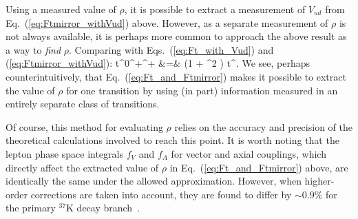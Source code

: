 Using a measured value of $\rho$, it is possible to extract a measurement of $V_{ud}$ from Eq.~(\ref{eq:Ftmirror_withVud}) above.  However, as a separate measurement of $\rho$ is not always available, it is perhaps more common to approach the above result as a way to \emph{find} $\rho$.  Comparing with Eqs.~(\ref{eq:Ft_with_Vud}) and (\ref{eq:Ftmirror_withVud}):  
\bea
{}t^{0^+\!^+}
&=& 
 \left(1 + \rho^2 \right) t^{}.
\label{eq:Ft_and_Ftmirror}
\eea
We see, perhaps counterintuitively, that Eq.~(\ref{eq:Ft_and_Ftmirror}) makes it possible to extract the value of $\rho$ for one transition by using (in part) information measured in an entirely separate class of transitions.  

Of course, this method for evaluating $\rho$ relies on the accuracy and precision of the theoretical calculations involved to reach this point.  It is worth noting that the lepton phase space integrals $f_V$ and $f_A$ for vector and axial couplings, which directly affect the extracted value of $\rho$ in Eq.~(\ref{eq:Ft_and_Ftmirror}) above, are identically the same under the allowed approximation.  However, when higher-order corrections are taken into account, they are found to differ by $\sim 0.9\%$ for the primary $^{37}$K decay branch~\cite{HayenSeverijns2019}.








